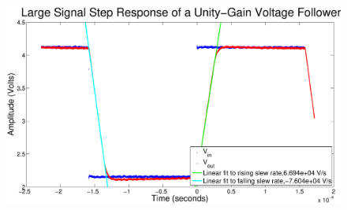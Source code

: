 \begin{figure}[H]
\centering
\includegraphics[width=\linewidth]{../Figures/Exp3P1.eps}
\caption{}
\label{fig:exp3p1}
\end{figure}